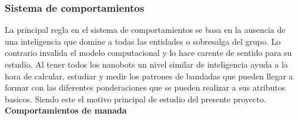 \subsubsection{Sistema de comportamientos}
\label{sec:sistema_comportamientos}

La principal regla en el sistema de comportamientos se basa en la ausencia de una inteligencia que domine a todas las entidades o sobresalga del grupo. Lo contrario invalida el modelo computacional y lo hace carente de sentido para su estudio. Al tener todos los nanobots un nivel similar de inteligencia ayuda a la hora de calcular, estudiar y medir los patrones de bandadas que pueden llegar a formar con las diferentes  ponderaciones que se pueden realizar a sus atributos basicos. Siendo este el motivo principal de estudio del presente proyecto.\\

\noindent\textbf{Comportamientos de manada}

